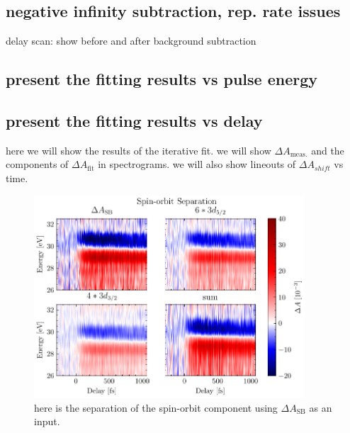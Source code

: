 \subsection{negative infinity subtraction, rep. rate issues}

delay scan: show before and after background subtraction

\subsection{present the fitting results vs pulse energy}

\subsection{present the fitting results vs delay}
here we will show the results of the iterative fit. we will show $\Delta A_{\textrm{meas.}}$ and the components of $\Delta A_{\textrm{fit}}$ in spectrograms. we will also show lineouts of $\Delta A_{shift}$ vs time.





\begin{figure}
	\centering
	\includegraphics[width=0.90\textwidth]{figures/chap4/OD_df_125Hz_Delay1-6_SO_sep_dASB.pdf}
	\caption{here is the separation of the spin-orbit component using $\Delta A_{\textrm{SB}}$ as an input.}
	\label{fig:OD_df_125Hz_Delay1-6_SO_sep_dASB}
\end{figure}

